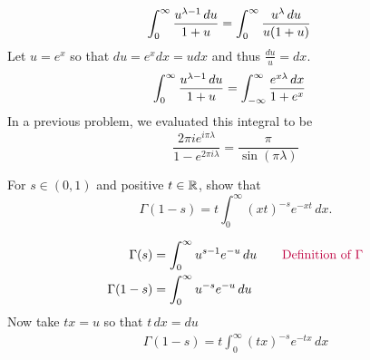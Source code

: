 \documentclass{homework}
\begin{document}
                                            \begin{solution}

                                            \begin{align*}
                                            \int_0^\infty \frac{u^{\lambda - 1}\, du }{1 + u} &=
                                            \int_0^\infty \frac{u^{\lambda}\, du }{u(1 + u)}
                                            \end{align*}
                                            Let $u=e^x$ so that $du = e^x dx = u dx$ and thus $\frac{du}{u} = dx$.
                                            \begin{align*}
                                            \int_0^\infty \frac{u^{\lambda - 1}\, du }{1 + u} &= \int_{-\infty}^\infty \frac{e^{x\lambda}\, dx }{1 + e^x}
                                            \end{align*}
                                            In a previous problem, we evaluated this integral to be 
                                            \[
                                            \frac{2\pi i e^{i\pi \lambda}}{1 - e^{2\pi i \lambda}} = \frac{\pi}{\sin(\pi \lambda)}
                                            \]
                                            \end{solution}

                                            \begin{problem}\label{integrate-gamma-one-minus-s}For $s \in (0,1)$ and positive $t \in \mathbb{R}$, show that
                                              \[
                                                  \Gamma(1 - s) = t \int_0^\infty (xt)^{-s} e^{-xt}\, dx.
                                                    \]
                                                    \end{problem}
                                                    \begin{solution}
                                                    \begin{align*}
                                                    \Gamma(s) &= \int_0^\infty u^{s-1} e^{-u}\, du\qquad\color{purple}\text{Definition of }\Gamma\\
                                                    \Gamma(1 - s) &= \int_0^\infty u^{-s} e^{-u}\, du
                                                    \end{align*}
                                                    Now take $tx = u$ so that $t\, dx = du$
                                                    \begin{align*}
                                                    \Gamma(1 - s) = t\int_0^\infty (tx)^{-s} e^{-tx}\, dx
                                                    \end{align*}

                                                    \end{solution}
\end{document}
